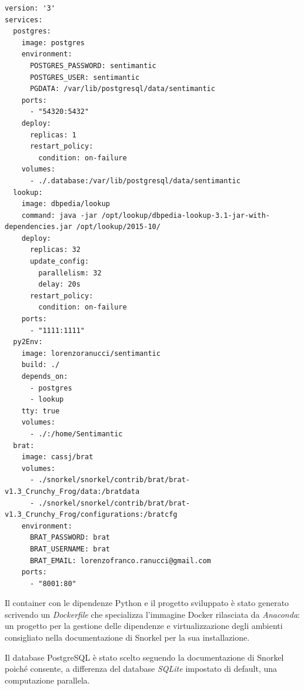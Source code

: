 \lstset{ basicstyle=\LSTfont, columns=fullflexible, xleftmargin=5mm, framexleftmargin=5mm, numbers=left, stepnumber=1, breaklines=true, breakatwhitespace=false, numberstyle=\footnotesize, numbersep=5pt, tabsize=2, frame=lines, captionpos=b}
\begin{lstlisting}[frame=single, caption={File docker-compose.yml di configurazione dell'infrastruttura Docker},label={lst:results:docker1},]  
version: '3'
services:
  postgres:
    image: postgres
    environment:
      POSTGRES_PASSWORD: sentimantic
      POSTGRES_USER: sentimantic
      PGDATA: /var/lib/postgresql/data/sentimantic
    ports:
      - "54320:5432"
    deploy:
      replicas: 1
      restart_policy:
        condition: on-failure
    volumes:
      - ./.database:/var/lib/postgresql/data/sentimantic
  lookup:
    image: dbpedia/lookup
    command: java -jar /opt/lookup/dbpedia-lookup-3.1-jar-with-dependencies.jar /opt/lookup/2015-10/
    deploy:
      replicas: 32
      update_config:
        parallelism: 32
        delay: 20s
      restart_policy:
        condition: on-failure
    ports:
      - "1111:1111"
  py2Env:
    image: lorenzoranucci/sentimantic
    build: ./
    depends_on:
      - postgres
      - lookup
    tty: true
    volumes:
      - ./:/home/Sentimantic
  brat:
    image: cassj/brat
    volumes:
      - ./snorkel/snorkel/contrib/brat/brat-v1.3_Crunchy_Frog/data:/bratdata
      - ./snorkel/snorkel/contrib/brat/brat-v1.3_Crunchy_Frog/configurations:/bratcfg
    environment:
      BRAT_PASSWORD: brat
      BRAT_USERNAME: brat
      BRAT_EMAIL: lorenzofranco.ranucci@gmail.com
    ports:
      - "8001:80"

\end{lstlisting}   

Il container con le dipendenze Python e il progetto sviluppato è stato generato scrivendo un \textit{Dockerfile} che specializza l'immagine Docker rilasciata da \textit{Anaconda}: un progetto per la gestione delle dipendenze e virtualizzazione degli ambienti consigliato nella documentazione di Snorkel per la sua installazione.

Il database PostgreSQL è stato scelto seguendo la documentazione di Snorkel poiché consente, a differenza del database \textit{SQLite} impostato di default, una computazione parallela. 
 





















